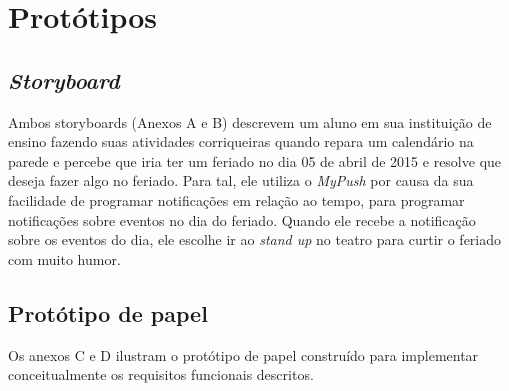 \chapter{Protótipos}

\section{\textit{Storyboard}}
  
  Ambos storyboards (Anexos A e B) descrevem um aluno em sua instituição de ensino fazendo suas atividades corriqueiras quando
  repara um calendário na parede e percebe que iria ter um feriado no dia 05 de abril de 2015 e resolve que deseja fazer algo no
  feriado. Para tal, ele utiliza o \textit{MyPush} por causa da sua facilidade de programar notificações em relação ao tempo, para programar
  notificações sobre eventos no dia do feriado. Quando ele recebe a notificação sobre os eventos do dia, ele escolhe ir ao \textit{stand up}
  no teatro para curtir o feriado com muito humor.
  
\section{Protótipo de papel}

  Os anexos C e D ilustram o protótipo de papel construído para implementar conceitualmente os requisitos funcionais descritos.